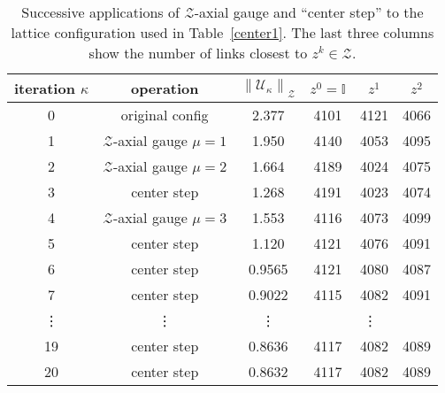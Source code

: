 \documentclass[preprint,aps,prd]{revtex4-2}
\newcommand{\zentrum}{\mathcal{Z}}       %
\newcommand{\config}{\mathcal{U}}
\newcommand\znorm[1]{\left\lVert #1 \right\rVert_\zentrum}
\begin{document}
\begin{table}
  \caption{Successive applications of $\zentrum$-axial gauge
    and ``center step'' to the lattice configuration
    used in Table~\ref{center1}.
    The last three columns show the number of links closest
    to $z^k \in \zentrum$.
    \label{center2}}
  \begin{tabular}{c|c|c|ccc}
    iteration $\kappa$ & operation & $\znorm{\config_\kappa}$
     & $z^0=\mathbb{I}$ & $z^1$ & $z^2$ \\
    \hline
    0 & original config              & 2.377  & 4101 & 4121 & 4066\\
    1 & $\zentrum$-axial gauge $\mu=1$& 1.950  & 4140 & 4053 & 4095\\
    2 & $\zentrum$-axial gauge $\mu=2$& 1.664  & 4189 & 4024 & 4075\\
    3 & center step                  & 1.268  & 4191 & 4023 & 4074\\
    4 & $\zentrum$-axial gauge $\mu=3$& 1.553  & 4116 & 4073 & 4099\\
    5 & center step                  & 1.120  & 4121 & 4076 & 4091\\
    6 & center step                  & 0.9565 & 4121 & 4080 & 4087\\
    7 & center step                  & 0.9022 & 4115 & 4082 & 4091\\
    \vdots & \vdots & \vdots & \multicolumn{3}{c}{\vdots}\\
    19 & center step                 & 0.8636 & 4117 & 4082 & 4089\\
    20 & center step                 & 0.8632 & 4117 & 4082 & 4089\\
  \end{tabular}
  \end{table}
\end{document}
